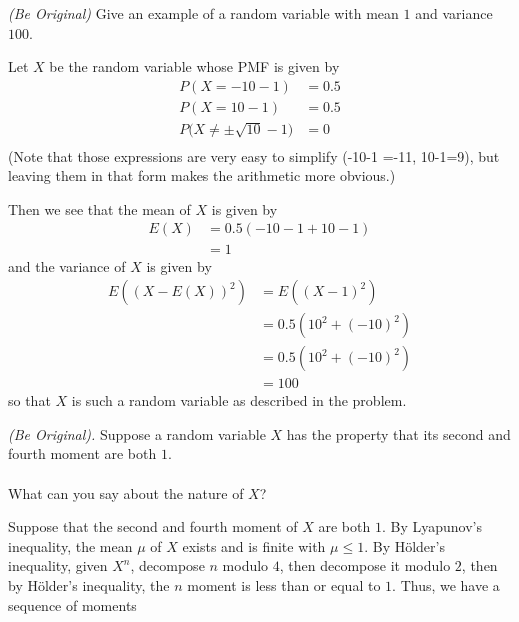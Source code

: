 \begin{problem}[Handout 7, \# 11]
  \emph{(Be Original)} Give an example of a random variable with mean
  \(1\) and variance \(100\).
\end{problem}
\begin{solution}
  Let $X$ be the random variable whose PMF is given by
  \begin{align*}
    P(X = -10-1) &= 0.5\\
    P(X = 10-1) &= 0.5\\
    P\bigl(X \neq \pm \sqrt{10}-1\bigr) &= 0\\
  \end{align*}
  (Note that those expressions are very easy to simplify (-10-1 =-11,
  10-1=9), but leaving them in that form makes the arithmetic more
  obvious.)

  Then we see that the mean of $X$ is given by
  \begin{align*}
    E(X) &= 0.5 (-10-1 +10-1)\\
         &= 1
  \end{align*}
  and the variance of $X$ is given by
  \begin{align*}
    E((X-E(X))^2) &= E((X-1)^2) \\
                  &= 0.5 (10^2 + (-10)^2) \\
                  &= 0.5 (10^2 + (-10)^2) \\
                  &= 100
  \end{align*}
  so that $X$ is such a random variable as described in the problem.
\end{solution}
\newpage

\begin{problem}[Handout 7, \# 13]
  \emph{(Be Original).} Suppose a random variable \(X\) has the property
  that its second and fourth moment are both \(1\).
  \\\\
  What can you say about the nature of \(X\)?
\end{problem}
\begin{solution}
  Suppose that the second and fourth moment of \(X\) are both \(1\). By
  Lyapunov's inequality, the mean \(\mu\) of \(X\) exists and is finite
  with \(\mu\leq 1\). By Hölder's inequality, given \(X^n\), decompose
  \(n\) modulo \(4\), then decompose it modulo \(2\), then by Hölder's
  inequality, the \(n\) moment is less than or equal to
  \(1\). Thus, we have a sequence of moments
\end{solution}
\newpage

